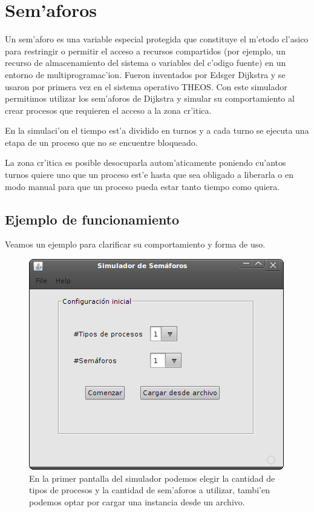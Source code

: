 \section{Sem'aforos}
Un sem'aforo es una variable especial protegida que constituye el m'etodo
cl'asico para restringir o permitir el acceso a recursos compartidos (por
ejemplo, un recurso de almacenamiento del sistema o variables del c'odigo
fuente) en un entorno de multiprogramac'ion. Fueron inventados por Edsger
Dijkstra y se usaron por primera vez en el sistema operativo THEOS.
Con este simulador permitimos utilizar los sem'aforos de Dijkstra y simular su
comportamiento al crear procesos que requieren el acceso a la zona cr'itica.

En la simulaci'on el tiempo est'a dividido en turnos y a cada turno se ejecuta
una etapa de un proceso que no se encuentre bloqueado. 

La zona cr'itica es posible desocuparla autom'aticamente poniendo cu'antos
turnos quiere uno que un proceso est'e hasta que sea obligado a liberarla o en
modo manual para que un proceso pueda estar tanto tiempo como quiera.

\subsection{Ejemplo de funcionamiento}
Veamos un ejemplo para clarificar su comportamiento y forma de uso.

\begin{figure}[h!]
\centering
 \includegraphics[scale=0.33,keepaspectratio=true]{./imagenes/semaforo/semaforos1.png}
 \caption{En la primer pantalla del simulador podemos elegir la cantidad de tipos de procesos y la cantidad de sem'aforos a utilizar, tambi'en podemos optar por cargar una instancia desde un archivo.}
\end{figure}
\newpage

